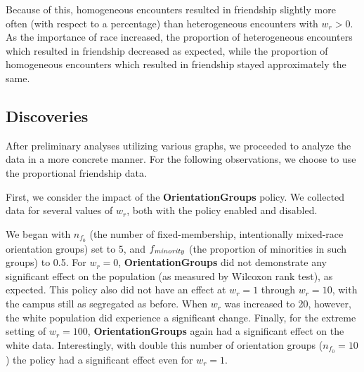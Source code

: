 Because of this, homogeneous encounters resulted in friendship slightly more
often (with respect to a percentage) than heterogeneous encounters with
$w_r>0$. As the importance of race increased, the proportion of heterogeneous
encounters which resulted in friendship decreased as expected, while the
proportion of homogeneous encounters which resulted in friendship stayed
approximately the same.

\subsection{Discoveries}

After preliminary analyses utilizing various graphs, we proceeded to analyze the data in a more concrete manner. For the following observations, we 
choose to use the proportional friendship data.



First, we consider the impact of the {\bf OrientationGroups} policy. We
collected data for several values of $w_r$, both with the policy enabled and
disabled. 

We began with $n_{f_0}$ (the number of fixed-membership, intentionally
mixed-race orientation groups) set to 5, and $f_{\text{\textit{minority}}}$
(the proportion of minorities in such groups) to 0.5. For $w_r=0$, {\bf
OrientationGroups} did not demonstrate any significant effect on the
population (as measured by Wilcoxon rank test), as expected. This policy also
did not have an effect at $w_r=1$ through $w_r=10$, with the campus still as
segregated as before. When $w_r$ was increased to 20, however, the white
population did experience a significant change. Finally, for the extreme
setting of $w_r=100$, {\bf OrientationGroups} again had a significant effect
on the white data. Interestingly, with double this number of orientation
groups ($n_{f_0}=10$) the policy had a significant effect even for $w_r=1$. 

